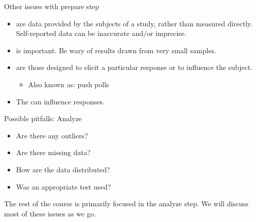 \documentclass[xcolor=table, aspectratio=169, bigger, handout]{beamer}
\begin{document}
\begin{frame}{Other issues with prepare step}
\begin{block}{}
\begin{itemize}
\item {} are data provided by the subjects of a study, rather than measured directly. Self-reported data can be inaccurate and/or imprecise.
\pause\item {} is important. Be wary of results drawn from very small samples.
\pause\item {} are those designed to elicit a particular response or to influence the subject.
\begin{itemize}
\item Also known as: push polls
\end{itemize}
\pause\item The  can influence responses.
\end{itemize}
\end{block}

\end{frame}

\begin{frame}{Possible pitfalls: Analyze}
 
\begin{block}{}
\begin{itemize}
\item Are there any outliers?
\item Are there missing data?
\item How are the data distributed?
\item Was an appropriate test used?
\end{itemize}
\end{block}

\begin{block}{}
The rest of the course is primarily focused in the analyze step. We will discuss most of these issues as we go.
\end{block}
\end{frame}
\end{document}
